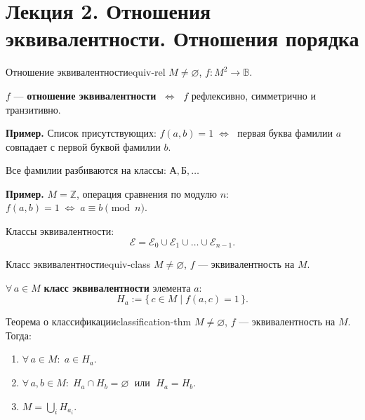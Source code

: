 \chapter{Лекция 2. Отношения эквивалентности. Отношения порядка}


\begin{defn}{Отношение эквивалентности}{equiv-rel}
$M \neq \varnothing$,\; $f\colon M^2 \to \mathbb{B}$.

$f$ --- \textbf{отношение эквивалентности} $\;\Leftrightarrow\;$
$f$ рефлексивно, симметрично и транзитивно.
\end{defn}

\textbf{Пример.} Список присутствующих:
$f(a,b) = 1 \;\Leftrightarrow\;$ первая буква фамилии $a$ совпадает
с первой буквой фамилии $b$.

Все фамилии разбиваются на классы: $\text{А}, \text{Б}, \ldots$

\textbf{Пример.} $M = \mathbb{Z}$, операция сравнения по модулю $n$:
$f(a,b) = 1 \;\Leftrightarrow\; a \equiv b \pmod{n}$.

Классы эквивалентности:
\[
  \mathcal{E} = \mathcal{E}_0 \cup \mathcal{E}_1 \cup \ldots \cup \mathcal{E}_{n-1}.
\]

\begin{defn}{Класс эквивалентности}{equiv-class}
$M \neq \varnothing$,\; $f$ --- эквивалентность на $M$.

$\forall\, a \in M$ \textbf{класс эквивалентности} элемента $a$:
\[
  H_a := \bigl\{\, c \in M \;\big|\; f(a, c) = 1 \,\bigr\}.
\]
\end{defn}

\begin{statement}{Теорема о классификации}{classification-thm}
$M \neq \varnothing$,\; $f$ --- эквивалентность на $M$. Тогда:
\begin{enumerate}
  \item $\forall\, a \in M\colon\; a \in H_a$.
  \item $\forall\, a, b \in M\colon\;
        H_a \cap H_b = \varnothing \;\text{ или }\; H_a = H_b$.
  \item $M = \bigcup\limits_{i} H_{a_i}$.
\end{enumerate}
\end{statement}

